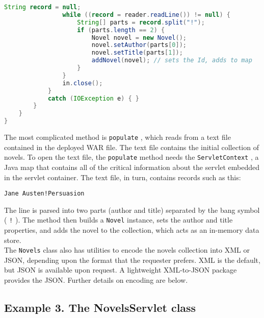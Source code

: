 \documentclass[12pt]{article}
\begin{document}
\begin{lstlisting}[language=java]
                String record = null;
                while ((record = reader.readLine()) != null) {
                    String[] parts = record.split("!");
                    if (parts.length == 2) {
                        Novel novel = new Novel();
                        novel.setAuthor(parts[0]);
                        novel.setTitle(parts[1]);
                        addNovel(novel); // sets the Id, adds to map
                    }
                }
                in.close();
            }
            catch (IOException e) { }
        }
    }
}

\end{lstlisting}

The most complicated method is \verb|populate| , which reads from a text file contained in the deployed WAR file. The text file contains the initial collection of novels. To open the text file, the \verb|populate| method needs the \verb|ServletContext| , a Java map that contains all of the critical information about the servlet embedded in the servlet container. The text file, in turn, contains records such as this:\\

\begin{lstlisting}
Jane Austen!Persuasion

\end{lstlisting}

The line is parsed into two parts (author and title) separated by the bang symbol ( \verb|!| ). The method then builds a \verb|Novel| instance, sets the author and title properties, and adds the novel to the collection, which acts as an in-memory data store.\\

The \verb|Novels| class also has utilities to encode the novels collection into XML or JSON, depending upon the format that the requester prefers. XML is the default, but JSON is available upon request. A lightweight XML-to-JSON package provides the JSON. Further details on encoding are below.

\subsection{Example 3. The NovelsServlet class}
\end{document}
